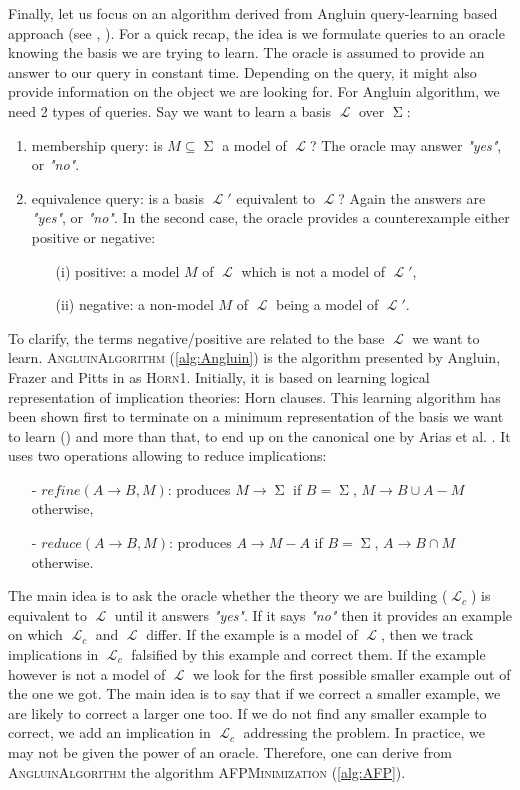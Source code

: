 \documentclass[runningheads]{llncs}
\DeclareMathOperator{\I}{\mathcal{L}}  %
\DeclareMathOperator{\Sg}{\Sigma}  %
\DeclareMathOperator{\imp}{\longrightarrow} %
\begin{document}
Finally, let us focus on an algorithm derived from Angluin query-learning based approach (see \cite{angluin_learning_1992}, \cite{arias_canonical_2009}). For a quick recap,  the idea is we formulate queries to an oracle knowing the basis we are trying to learn. The oracle is assumed to provide an answer to our query in constant time. Depending on the query, it might also provide information on the object we are looking for. For Angluin algorithm, we need 2 types of queries. Say we want to learn a basis $\I$ over $\Sg$:
\begin{enumerate}
	\item membership query: is $M \subseteq \Sg$ a model of $\I$? The
	oracle may answer \textit{"yes"}, or \textit{"no"}.
	\item equivalence query: is a basis $\I'$ equivalent to $\I$? Again
	the answers are \textit{"yes"}, or \textit{"no"}. In the second case, the oracle provides a counterexample either positive or negative:
	\begin{itemize}
		\item[(i)] positive: a model $M$ of $\I$ which is not a
		model of $\I'$,
		\item[(ii)] negative: a non-model $M$ of $\I$ being a model
		of $\I'$. 
	\end{itemize}
\end{enumerate}
\noindent To clarify, the terms negative/positive are related to the base $\I$
we want to learn. \textsc{AngluinAlgorithm} (\ref{alg:Angluin}) is the algorithm presented by Angluin, Frazer and Pitts in \cite{angluin_learning_1992} as \textsc{Horn1}. 
Initially, it is based on learning logical representation of implication theories: Horn clauses. This learning algorithm has been shown first to terminate on a minimum representation of the basis we want to learn (\cite{angluin_learning_1992}) and more than that, to end up on the canonical
one by Arias et al. \cite{arias_canonical_2009}. It uses two operations allowing to reduce implications:
\begin{itemize}
	\item[-] $\textit{refine}(A \imp B, M)$: produces $M \imp \Sg$ if $B = \Sg$, $M \imp B \cup A - M$ otherwise,
	\item[-] $\textit{reduce}(A \imp B, M)$: produces $A \imp M - A$ if $B = \Sg$, $A \imp B \cap M$ otherwise.
\end{itemize}
\noindent The main idea is to ask the oracle whether the theory we are building ($\I_c$) is equivalent to $\I$ until it answers \textit{"yes"}. If it says \textit{"no"} then it provides an example on which $\I_c$ and $\I$ differ. If
the example is a model of $\I$, then we track implications in $\I_c$ falsified
by this example and correct them. If the example however is not a model of $\I$
we look for the first possible smaller example out of the one we got. The main
idea is to say that if we correct a smaller example, we are likely to correct
a larger one too. If we do not find any smaller example to correct, we add 
an implication in $\I_c$ addressing the problem. In practice, we may not be given the power of an oracle. Therefore, one can derive from \textsc{AngluinAlgorithm} the algorithm \textsc{AFPMinimization} (\ref{alg:AFP}).
\end{document}

